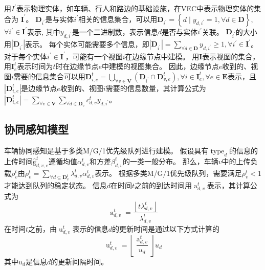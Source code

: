 用$I^{\prime}$表示物理实体，如车辆、行人和路边的基础设施，在VEC中表示物理实体的集合为 $\mathbf{I}^{\prime}$。
$\mathbf{D}_{i^{\prime}}$是与实体$i^{\prime}$相关的信息集合，可以用$\mathbf{D}_{i^{\prime}}=\left\{d \mid y_{d, i^{\prime}} = 1, \forall d \in \mathbf{D} \right\}$, $\forall i^{\prime} \in \mathbf{I}^{\prime}$表示, 其中$y_{d, i^{\prime}}$是一个二进制数，表示信息$d$是否与实体$i^{\prime}$关联。
$\mathbf{D}_{i^{\prime}}$的大小用$|\mathbf{D}_{i^{\prime}}|$表示。
每个实体可能需要多个信息，即$|\mathbf{D}_{i^{\prime}}| = \sum_{\forall d \in \mathbf{D}}y_{d, i^{\prime}} \geq 1, \forall i^{\prime} \in \mathbf{I}^{\prime}$。
对于每个实体$i^{\prime} \in \mathbf{I}^{\prime}$，可能有一个视图$i$在边缘节点中建模。
用$\mathbf{I}$表示视图的集合，用$\mathbf{I}_e^{t}$表示时间为$t$时在边缘节点$e$中建模的视图集合。
因此，边缘节点$e$收到的、视图$i$需要的信息集合可以用$\mathbf{D}_{i, e}^t=\bigcup_{\forall v \in \mathbf{V}}\left(\mathbf{D}_{i^{\prime}} \cap \mathbf{D}_{v, e}^t\right), \forall i \in \mathbf{I}_e^{t}, \forall e \in \mathbf{E}$表示，且 $| \mathbf{D}_{i, e}^t |$是边缘节点$e$收到的、视图$i$需要的信息数量，其计算公式为$| \mathbf{D}_{i, e}^t | =  \sum_{\forall v \in \mathbf{V}} \sum_{\forall d \in \mathbf{D}_v} c_{d, v}^t  y_{d, i^{\prime}}$。

\subsection{协同感知模型}
车辆协同感知是基于多类M/G/1优先级队列\cite{moltafet2020age}进行建模。
假设具有$\operatorname{type}_d$的信息的上传时间$\operatorname{\hat{g}}_{d, v, e}^t$遵循均值$\alpha_{d, v}^t$和方差$\beta_{d, v}^t$的一类一般分布。
那么，车辆$v$中的上传负载$\rho_{v}^{t}$由$ \rho_{v}^{t}=\sum_{\forall d \subseteq \mathbf{D}_v^t} \lambda_{d, v}^{t} \alpha_{d, v}^t$表示。
根据多类M/G/1优先级队列，需要满足$\rho_{v}^{t} < 1$才能达到队列的稳定状态。
信息$d$在时间$t$之前的到达时间用$\operatorname{a}_{d, v}^t$表示，其计算公式为
\begin{equation}
    \operatorname{a}_{d, v}^t =  \frac{\left \lfloor t \lambda_{d, v}^t \right \rfloor }{\lambda_{d, v}^{t}} 
\end{equation}
在时间$t$之前，由$\operatorname{u}_{d, v}^t$表示的信息$d$的更新时间是通过以下方式计算的
\begin{equation}
    \operatorname{u}_{d, v}^t = \left \lfloor  \frac{\operatorname{a}_{d, v}^t}{u_d} \right \rfloor  u_d
\end{equation}
其中$u_d$是信息$d$的更新间隔时间。


